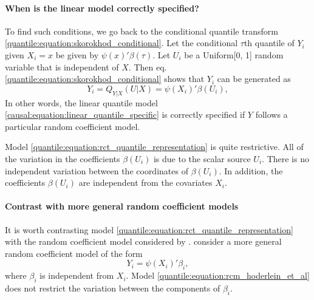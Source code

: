\paragraph{When is the linear model correctly specified?}
 
 To find such conditions, we go back to the conditional quantile transform \eqref{quantile:equation:skorokhod_conditional}.  
 Let the conditional $\tau$th quantile of $Y_i$ given $X_i=x$ be given by $\psi(x)'\beta(\tau)$. Let $U_i$ be a Uniform[0, 1] random variable that is independent of $X$. Then eq. \eqref{quantile:equation:skorokhod_conditional} shows that $Y_i$ can be   generated as 
 \begin{equation}\label{quantile:equation:rct_quantile_representation}
 	 Y_i = Q_{Y|X}(U|X) = \psi(X_i)'\beta(U_i),
 \end{equation}  
 In other words, the linear quantile model  \eqref{causal:equation:linear_quantile_specific} is correctly specified if $Y$ follows a particular random coefficient model.
 
  Model \eqref{quantile:equation:rct_quantile_representation} is quite restrictive. All of the variation in the coefficients  $\beta(U_i)$ is due to the scalar source $U_i$. There is no independent variation between the coordinates of $\beta(U_i)$. In addition, the coefficients $\beta(U_i)$ are independent from the covariates $X_i$.
 
  \paragraph{Contrast with more general random coefficient models}
 
 It is worth contrasting   model \eqref{quantile:equation:rct_quantile_representation} with the random coefficient model considered by  \cite{Hoderlein2010}. \cite{Hoderlein2010} consider a more general random coefficient model of the form
 \begin{equation}\label{quantile:equation:rcm_hoderlein_et_al}
 	Y_i = \psi(X_i)'\beta_i,
 \end{equation} 
 where $\beta_i$ is independent from $X_i$. Model \eqref{quantile:equation:rcm_hoderlein_et_al} does not restrict the variation between the components of $\beta_i$.
 

